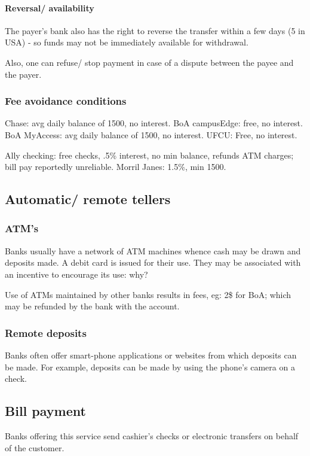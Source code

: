 \documentclass[oneside, article]{memoir}
\begin{document}
\paragraph{Reversal/ availability}
The payer's bank also has the right to reverse the transfer within a few days (5 in USA) - so funds may not be immediately available for withdrawal.

Also, one can refuse/ stop payment in case of a dispute between the payee and the payer.

\subsubsection{Fee avoidance conditions}
Chase: avg daily balance of 1500, no interest. BoA campusEdge: free, no interest. BoA MyAccess: avg daily balance of 1500, no interest. UFCU: Free, no interest.

Ally checking: free checks, .5\% interest, no min balance, refunds ATM charges; bill pay reportedly unreliable. Morril Janes: 1.5\%, min 1500.

\subsection{Automatic/ remote tellers}
\subsubsection{ATM's}
Banks usually have a network of ATM machines whence cash may be drawn and deposits made. A debit card is issued for their use. They may be associated with an incentive to encourage its use: why?

Use of ATMs maintained by other banks results in fees, eg: 2\$ for BoA; which may be refunded by the bank with the account.

\subsubsection{Remote deposits}
Banks often offer smart-phone applications or websites from which deposits can be made. For example, deposits can be made by using the phone's camera on a check.

\subsection{Bill payment}
Banks offering this service send cashier's checks or electronic transfers on behalf of the customer.
\end{document}
